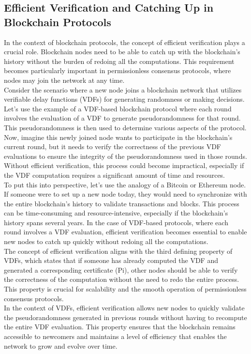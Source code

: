 \subsection{Efficient Verification and Catching Up in Blockchain Protocols}
In the context of blockchain protocols, the concept of efficient verification plays a crucial role. Blockchain nodes need to be able to catch up with the blockchain's history without the burden of redoing all the computations. This requirement becomes particularly important in permissionless consensus protocols, where nodes may join the network at any time.\\
Consider the scenario where a new node joins a blockchain network that utilizes verifiable delay functions (VDFs) for generating randomness or making decisions. Let's use the example of a VDF-based blockchain protocol where each round involves the evaluation of a VDF to generate pseudorandomness for that round. This pseudorandomness is then used to determine various aspects of the protocol.\\
Now, imagine this newly joined node wants to participate in the blockchain's current round, but it needs to verify the correctness of the previous VDF evaluations to ensure the integrity of the pseudorandomness used in those rounds. Without efficient verification, this process could become impractical, especially if the VDF computation requires a significant amount of time and resources.\\
To put this into perspective, let's use the analogy of a Bitcoin or Ethereum node. If someone were to set up a new node today, they would need to synchronize with the entire blockchain's history to validate transactions and blocks. This process can be time-consuming and resource-intensive, especially if the blockchain's history spans several years. In the case of VDF-based protocols, where each round involves a VDF evaluation, efficient verification becomes essential to enable new nodes to catch up quickly without redoing all the computations.\\
The concept of efficient verification aligns with the third defining property of VDFs, which states that if someone has already computed the VDF and generated a corresponding certificate (Pi), other nodes should be able to verify the correctness of the computation without the need to redo the entire process. This property is crucial for scalability and the smooth operation of permissionless consensus protocols.\\
In the context of VDFs, efficient verification allows new nodes to quickly validate the pseudorandomness generated in previous rounds without having to recompute the entire VDF evaluation. This property ensures that the blockchain remains accessible to newcomers and maintains a level of efficiency that enables the network to grow and evolve over time.


